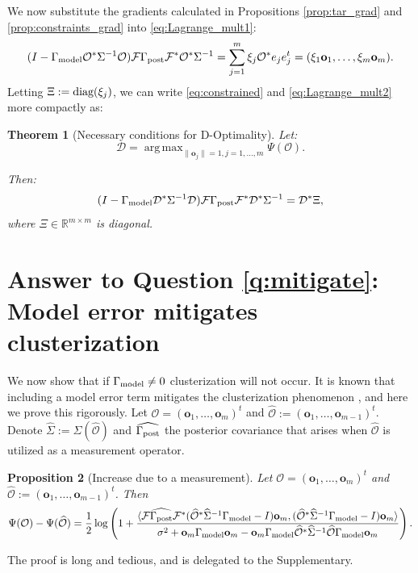 \documentclass[ba]{imsart}
\newcommand{\diag}{\textup{diag}}
\newcommand{\obs}{\mathcal{O}}
\newcommand{\fwd}{\mathcal{F}}
\newcommand{\obsm}{\widehat{\obs}}
\newcommand{\Sigmam}{\widehat{\Sigma}}
\newcommand{\postcovm}{\widehat{\Gamma_{\textup{post}}}}
\newcommand{\tar}{\Psi}
\DeclareMathOperator*{\argmax}{arg\,max}
\newcommand{\meas}{\mathbf{o}}
\newcommand{\opt}{\mathcal{D}}
\theoremstyle{plain}
\newtheorem{theorem}{Theorem}
\newtheorem{proposition}[theorem]{Proposition}
\theoremstyle{definition}
\theoremstyle{remark}
\begin{document}
We now substitute the gradients calculated in Propositions
\ref{prop:tar_grad} and \ref{prop:constraints_grad} into
\eqref{eq:Lagrange_mult1}:
\begin{equation}\label{eq:constrained}
  (I - \modcov \obs^* \Sigma^{-1} \obs) \fwd \postcov \fwd^* \obs^*\Sigma^{-1}
  = \sum_{j=1}^m \xi_j \obs^* e_je_j^t = (\xi_1 \meas_1,\dots,\xi_m \meas_m).
\end{equation} 
Letting $\Xi := \diag(\xi_j)$, we can write \eqref{eq:constrained} and
\eqref{eq:Lagrange_mult2} more compactly as:

\begin{theorem}[Necessary conditions for D-Optimality]\label{thm:constrained}
  Let:
  \begin{equation*}
    \opt = \argmax_{\|\meas_j\| = 1, j=1,\dots,m}\tar(\obs).
  \end{equation*}
  
  Then:
  \begin{equation*}
    ( I - \modcov \opt^* \Sigma^{-1} \opt) \fwd \postcov \fwd^* \opt^*  \Sigma^{-1}
    = \opt^* \Xi, 
  \end{equation*}
  where $\Xi \in \mathbb{R}^{m \times m}$ is diagonal.
\end{theorem}




 \section{Answer to Question \ref{q:mitigate}: Model error mitigates clusterization}\label{section:non_vanishing}
We now show that if $\Gamma_{\textup{model}} \neq 0$ clusterization will not occur. It
is known that including a model error term mitigates the
clusterization phenomenon \cite{Ucinski05}, and here we prove this
rigorously. Let $\obs = (\meas_1,\dots,\meas_m)^t$ and $\obsm :=
(\meas_1,\dots,\meas_{m-1})^t$. Denote $\Sigmam := \Sigma (\obsm)$ and
$\postcovm$ the posterior covariance that arises when $\obsm$ is
utilized as a measurement operator.

\begin{proposition}[Increase due to a measurement]\label{prop:design_increase}
  Let $\obs = (\meas_1,\dots,\meas_m)^t$ and $\obsm :=
  (\meas_1,\dots,\meas_{m-1})^t$. Then
  \begin{equation}\label{eq:conclusion}
    \tar( \obs ) - \tar (\obsm ) =
    \frac12 \log \left ( 1 + \frac{
      \langle \fwd \postcovm \fwd^* (\obsm^* \Sigmam^{-1} \modcov - I ) \meas_m,
      (\obsm^* \Sigmam^{-1} \modcov - I ) \meas_m \rangle
    }{
      \sigma^2 + \meas_m \modcov \meas_m - \meas_m \modcov \obsm^* \Sigmam^{-1} \obsm \modcov \meas_m 
    }       
    \right ).
  \end{equation}
\end{proposition}
The proof is long and tedious, and is delegated to the Supplementary.
\end{document}
